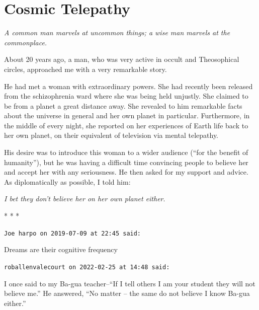 \section{Cosmic Telepathy}

\begin{quotex}
\emph{A common man marvels at uncommon things; a wise man marvels at the commonplace.}
\end{quotex}

About 20 years ago, a man, who was very active in occult and Theosophical circles, approached me with a very remarkable story.

He had met a woman with extraordinary powers. She had recently been released from the schizophrenia ward where she was being held unjustly. She claimed to be from a planet a great distance away. She revealed to him remarkable facts about the universe in general and her own planet in particular. Furthermore, in the middle of every night, she reported on her experiences of Earth life back to her own planet, on their equivalent of television via mental telepathy.

His desire was to introduce this woman to a wider audience (``for the benefit of humanity''), but he was having a difficult time convincing people to believe her and accept her with any seriousness. He then asked for my support and advice. As diplomatically as possible, I told him:

\emph{I bet they don't believe her on her own planet either}.




\begin{center}* * *\end{center}

\begin{footnotesize}
\begin{sffamily}
\texttt{Joe harpo on 2019-07-09 at 22:45 said:}

Dreams are their cognitive frequency

\hfill

\texttt{roballenvalecourt on 2022-02-25 at 14:48 said:}

I once said to my Ba-gua teacher--``If I tell others I am your student they will not believe me.'' He answered, ``No matter -- the same do not believe I know Ba-gua either.''


\hfill

\end{sffamily}
\end{footnotesize}

